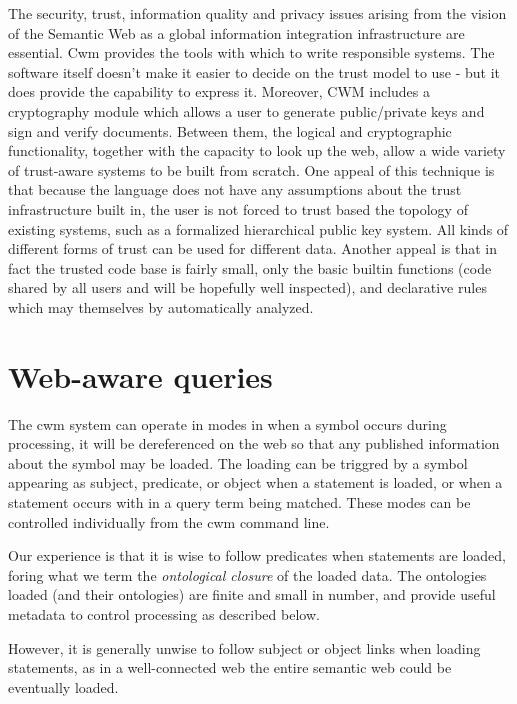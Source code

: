 \documentclass{tlp}
\begin{document}
\par \empty The security, trust, information
quality and privacy issues arising from the vision of the Semantic
Web as a global information integration infrastructure are
essential. Cwm provides the tools with which to write responsible
systems. The software itself doesn't make it easier to decide on
the trust model to use - but it does provide the capability to
express it. Moreover, CWM includes a cryptography module which
allows a user to generate public/private keys and sign and verify
documents. Between them, the logical and cryptographic
functionality, together with the capacity to look up the web, allow
a wide variety of trust-aware systems to be built from scratch. One
appeal of this technique is that because the language does not have
any assumptions about the trust infrastructure built in, the user
is not forced to trust based the topology of existing systems, such
as a formalized hierarchical public key system. All kinds of
different forms of trust can be used for different data. Another
appeal is that in fact the trusted code base is fairly small, only
the basic builtin functions (code shared by all users and will be
hopefully well inspected), and declarative rules which may
themselves by automatically analyzed.
\section{Web-aware queries}
  

\par The cwm system can operate in modes in when a symbol occurs
during processing, it will be dereferenced on the web so that any
published information about the symbol may be loaded. The loading
can be triggred by a symbol appearing as subject, predicate, or
object when a statement is loaded, or when a statement occurs with
in a query term being matched. These modes can be controlled
individually from the cwm command line.

\par Our experience is that it is wise to follow predicates when
statements are loaded, foring what we term the {\em ontological
closure} of the loaded data. The ontologies loaded (and their
ontologies) are finite and small in number, and provide useful
metadata to control processing as described below.

\par However, it is generally unwise to follow subject or object
links when loading statements, as in a well-connected web the
entire semantic web could be eventually loaded.
\end{document}
